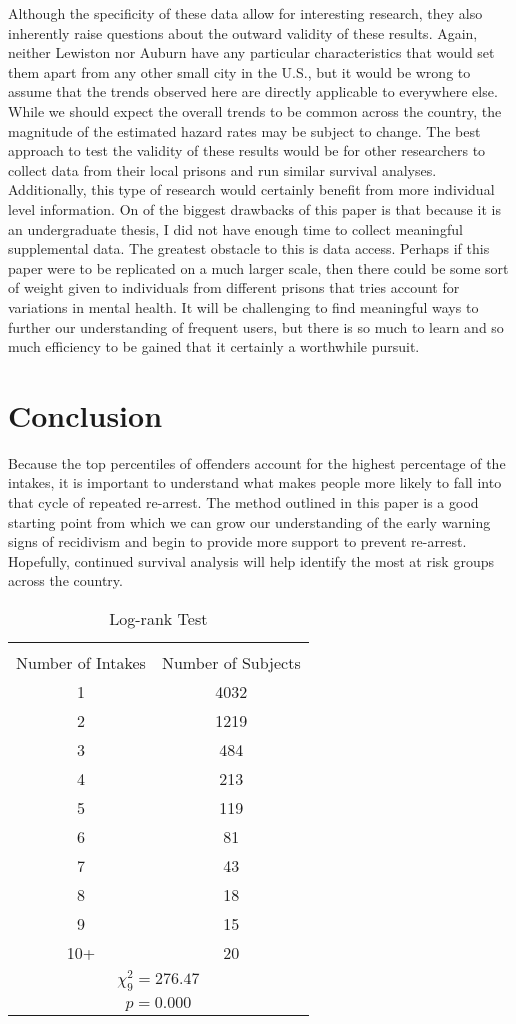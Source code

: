 \documentclass{article}
\begin{document}
Although the specificity of these data allow for interesting research, they also inherently raise questions about the outward validity of these results. Again, neither Lewiston nor Auburn have any particular characteristics that would set them apart from any other small city in the U.S., but it would be wrong to assume that the trends observed here are directly applicable to everywhere else. While we should expect the overall trends to be common across the country, the magnitude of the estimated hazard rates may be subject to change. The best approach to test the validity of these results would be for other researchers to collect data from their local prisons and run similar survival analyses. Additionally, this type of research would certainly benefit from more individual level information. On of the biggest drawbacks of this paper is that because it is an undergraduate thesis, I did not have enough time to collect meaningful supplemental data. The greatest obstacle to this is data access. Perhaps if this paper were to be replicated on a much larger scale, then there could be some sort of weight given to individuals from different prisons that tries account for variations in mental health. It will be challenging to find meaningful ways to further our understanding of frequent users, but there is so much to learn and so much efficiency to be gained that it certainly a worthwhile pursuit. 

\section{Conclusion}
Because the top percentiles of offenders account for the highest percentage of the intakes, it is important to understand what makes people more likely to fall into that cycle of repeated re-arrest. The method outlined in this paper is a good starting point from which we can grow our understanding of the early warning signs of recidivism and begin to provide more support to prevent re-arrest. Hopefully, continued survival analysis will help identify the most at risk groups across the country.

\begin{table}[t]
    \centering
\begin{tabular}{cc} \hline
 &  \\
Number of Intakes & Number of Subjects  \\ \hline

1 & 4032  \\
2 & 1219   \\
3 & 484  \\
4 &  213   \\
5 & 119  \\
6 & 81  \\
7 &  43\\
8 & 18  \\ 
9 & 15 \\
10+ & 20 \\ \hline
\multicolumn{5}{c}{$\chi ^2 _9 = 276.47$}\\
\multicolumn{5}{c}{$p = 0.000$}
\end{tabular}
    \caption{Log-rank Test}
    \label{tab2}
\end{table}

\newpage
\printbibliography
\end{document}
